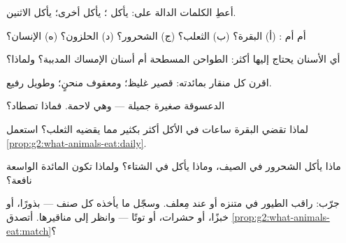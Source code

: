 \begin{exercise}[$\star$]\label{exo:g2:what-animals-eat:1}
أعطِ الكلمات الدالة على:  يأكل ؛  يأكل 
أخرى؛  يأكل الاثنين.
\end{exercise}

\begin{exercise}[$\star$]\label{exo:g2:what-animals-eat:2}
 أم  أم : (أ) البقرة؟ (ب) الثعلب؟ (ج) الشحرور؟ (د)
الحلزون؟ (ه) الإنسان؟
\end{exercise}

\begin{exercise}[$\star$]\label{exo:g2:what-animals-eat:3}
أي الأسنان يحتاج إليها  أكثر: الطواحن المسطحة أم أسنان
الإمساك المدببة؟ ولماذا؟
\end{exercise}

\begin{exercise}[$\star$]\label{exo:g2:what-animals-eat:4}
اقرن كل منقار بمائدته: قصير غليظ؛ ومعقوف منحنٍ؛ وطويل رفيع.
\end{exercise}

\begin{exercise}[$\star$]\label{exo:g2:what-animals-eat:5}
الدعسوقة صغيرة جميلة --- وهي لاحمة. فماذا تصطاد؟
\end{exercise}

\begin{exercise}[$\star$]\label{exo:g2:what-animals-eat:6}
لماذا تقضي البقرة ساعات في الأكل أكثر بكثير مما يقضيه الثعلب؟
استعمل \cref{prop:g2:what-animals-eat:daily}.
\end{exercise}

\begin{exercise}[$\star$]\label{exo:g2:what-animals-eat:7}
ماذا يأكل الشحرور في الصيف، وماذا يأكل في الشتاء؟ ولماذا تكون
المائدة الواسعة نافعة؟
\end{exercise}

\begin{exercise}[$\star$]\label{exo:g2:what-animals-eat:8}
جرّب: راقب الطيور في متنزه أو عند مِعلف. وسجّل ما يأخذه كل صنف ---
بذورًا، أو خبزًا، أو حشرات، أو توتًا --- وانظر إلى مناقيرها. أتصدق
\cref{prop:g2:what-animals-eat:match}؟
\end{exercise}

